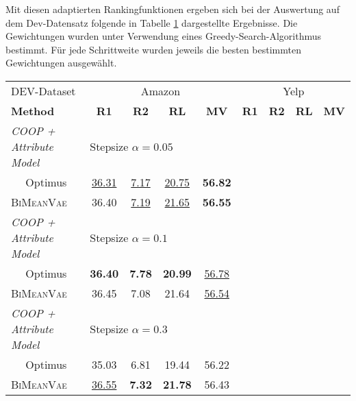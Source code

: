 Mit diesen adaptierten Rankingfunktionen ergeben sich bei der Auswertung auf dem Dev-Datensatz folgende in Tabelle \ref{dev_eval_results} dargestellte Ergebnisse.
Die Gewichtungen wurden unter Verwendung eines Greedy-Search-Algorithmus bestimmt.
Für jede Schrittweite wurden jeweils die besten bestimmten Gewichtungen ausgewählt.


\begin{table}[!h]
    \label{dev_eval_results}
    \centering
    \begin{tabular}{@{}lcccccccc@{}}
    \toprule
    DEV-Dataset                    & \multicolumn{4}{c}{Amazon} & \multicolumn{4}{c}{Yelp} \\ 
    \textbf{Method} & \textbf{R1} & \textbf{R2} & \textbf{RL} & \textbf{MV} & \textbf{R1} & \textbf{R2} & \textbf{RL} & \textbf{MV}\\ \midrule 
    
    \textit{COOP + Attribute Model}        &      \multicolumn{3}{l}{Stepsize $\alpha= 0.05$}             &        &   & &     \\
    $\quad$ Optimus          &  \underline{36.31} & \underline{7.17}& \underline{20.75}&\textbf{56.82} &     &      &   &      \\ 
    $\quad$ \textsc{BiMeanVae} & 36.40 & \underline{7.19} & \underline{21.65} & \textbf{56.55} & & & &\\ [0.2cm] %
    
    \textit{COOP + Attribute Model}        &         \multicolumn{3}{l}{Stepsize $\alpha= 0.1$}            &        &   & &     \\
    $\quad$ Optimus            & \textbf{36.40}  & \textbf{7.78}&\textbf{20.99} &\underline{56.78} &     &      &   &   \\ 
    $\quad$ \textsc{BiMeanVae}& 36.45 & 7.08 & 21.64 & \underline{56.54} & & & & \\[0.2cm]  %


    \textit{COOP + Attribute Model}        &      \multicolumn{3}{l}{Stepsize $\alpha= 0.3$}                &        &        &   & &     \\
    $\quad$ Optimus            & 35.03  & 6.81& 19.44 &56.22 &     &      &   &   \\ 
    $\quad$ \textsc{BiMeanVae} & \underline{36.55} & \textbf{7.32} & \textbf{21.78} & 56.43 & & & &\\[0.2cm] %



\end{tabular}
\end{table}
